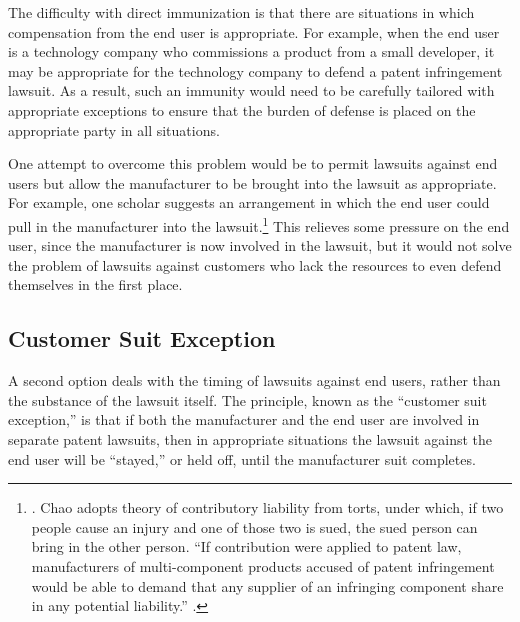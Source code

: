 \documentclass[11pt,twocolumn,titlepage]{article}
\begin{document}
The difficulty with direct immunization is that there are situations
in which compensation from the end user is appropriate.
For example, when the
end user is a technology company who commissions a product from a small
developer, it may be appropriate for the technology company to defend a patent
infringement lawsuit. As a result, such an immunity would need to
be carefully tailored with appropriate exceptions to ensure that the burden of
defense is placed on the appropriate party in all situations.

One attempt to overcome this problem would be to permit lawsuits against end
users but allow the manufacturer to be brought into the lawsuit as appropriate.
For example, one scholar suggests an arrangement in which the end user could
pull in the manufacturer into the lawsuit.\footnote{. Chao adopts theory of contributory liability from torts, under which,
if two people cause an injury and one of those two is sued, the sued person can
bring in the other person. ``If contribution were applied to patent law,
manufacturers of multi-component products accused of patent infringement would
be able to demand that any supplier of an infringing component share in any
potential liability.'' .} This relieves some pressure on
the end user, since the manufacturer is now involved in the lawsuit, but it
would not solve the problem of lawsuits against customers who lack the resources
to even defend themselves in the first place.

\subsection{Customer Suit Exception}
\SectionNote

A second option deals with the timing of lawsuits against end users, rather than
the substance of the lawsuit itself. The principle, known as the ``customer suit
exception,'' is that if both the manufacturer and the end user are involved in
separate patent lawsuits, then in appropriate situations the lawsuit against the
end user will be ``stayed,'' or held off, until the manufacturer suit
completes.
\end{document}
